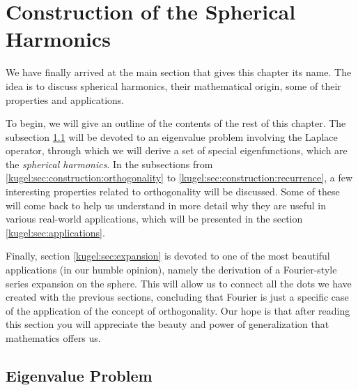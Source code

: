 
\section{Construction of the Spherical Harmonics}

We have finally arrived at the main section that gives this chapter its name.
The idea is to discuss spherical harmonics, their mathematical origin, some of
their properties and applications.

To begin, we will give an outline of the contents of the rest of this chapter.
The subsection \ref{kugel:sec:construction:eigenvalue} will be devoted to an
eigenvalue problem involving the Laplace operator, through which we will derive
a set of special eigenfunctions, which are the \emph{spherical harmonics}.  In
the subsections from \ref{kugel:sec:construction:orthogonality} to
\ref{kugel:sec:construction:recurrence}, a few interesting properties related to
orthogonality will be discussed. Some of these will come back to help us
understand in more detail why they are useful in various real-world
applications, which will be presented in the section
\ref{kugel:sec:applications}. 

Finally, section \ref{kugel:sec:expansion} is devoted to one of the most
beautiful applications (in our humble opinion), namely the derivation of a
Fourier-style series expansion on the sphere.  This will allow us to connect all
the dots we have created with the previous sections, concluding that Fourier is
just a specific case of the application of the concept of orthogonality. Our
hope is that after reading this section you will appreciate the beauty and power
of generalization that mathematics offers us.

\subsection{Eigenvalue Problem}
\label{kugel:sec:construction:eigenvalue}

